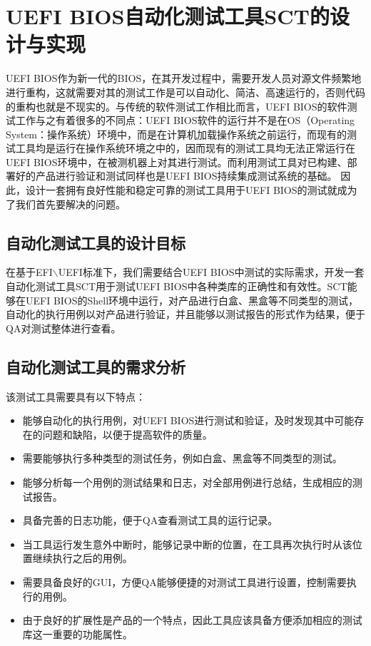 \chapter{UEFI BIOS自动化测试工具SCT的设计与实现}
\label{cha:intro}
	
	UEFI BIOS作为新一代的BIOS，在其开发过程中，需要开发人员对源文件频繁地进行重构，这就需要对其的测试工作是可以自动化、简洁、高速运行的，否则代码的重构也就是不现实的。与传统的软件测试工作相比而言，UEFI BIOS的软件测试工作与之有着很多的不同点：UEFI BIOS软件的运行并不是在OS（Operating System：操作系统）环境中，而是在计算机加载操作系统之前运行，而现有的测试工具均是运行在操作系统环境之中的，因而现有的测试工具均无法正常运行在UEFI BIOS环境中，在被测机器上对其进行测试。而利用测试工具对已构建、部署好的产品进行验证和测试同样也是UEFI BIOS持续集成测试系统的基础。 因此，设计一套拥有良好性能和稳定可靠的测试工具用于UEFI BIOS的测试就成为了我们首先要解决的问题。
	
\section{自动化测试工具的设计目标}

	在基于EFI$\backslash$UEFI标准下，我们需要结合UEFI BIOS中测试的实际需求，开发一套自动化测试工具SCT用于测试UEFI BIOS中各种类库的正确性和有效性。SCT能够在UEFI BIOS的Shell环境中运行，对产品进行白盒、黑盒等不同类型的测试，自动化的执行用例以对产品进行验证，并且能够以测试报告的形式作为结果，便于QA对测试整体进行查看。
	
\section{ 自动化测试工具的需求分析}

  该测试工具需要具有以下特点：

  \begin{itemize}
    \item 能够自动化的执行用例，对UEFI BIOS进行测试和验证，及时发现其中可能存在的问题和缺陷，以便于提高软件的质量。
	\item 需要能够执行多种类型的测试任务，例如白盒、黑盒等不同类型的测试。
	\item 能够分析每一个用例的测试结果和日志，对全部用例进行总结，生成相应的测试报告。
	\item 具备完善的日志功能，便于QA查看测试工具的运行记录。
	\item 当工具运行发生意外中断时，能够记录中断的位置，在工具再次执行时从该位置继续执行之后的用例。
	\item 需要具备良好的GUI，方便QA能够便捷的对测试工具进行设置，控制需要执行的用例。
	\item 由于良好的扩展性是产品的一个特点，因此工具应该具备方便添加相应的测试库这一重要的功能属性。
  \end{itemize}


